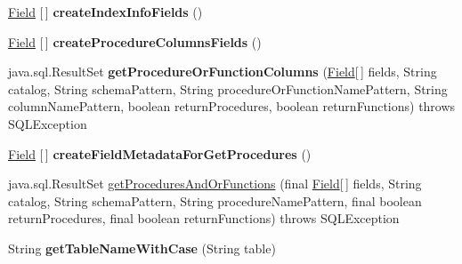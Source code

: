 \begin{DoxyCompactItemize}
\item 
\mbox{\label{classcom_1_1mysql_1_1cj_1_1jdbc_1_1_database_meta_data_a1bac977fae79104ef21d90a3d1d9613a}} 
\mbox{\hyperlink{classcom_1_1mysql_1_1cj_1_1result_1_1_field}{Field}} \mbox{[}$\,$\mbox{]} {\bfseries create\+Index\+Info\+Fields} ()
\item 
\mbox{\label{classcom_1_1mysql_1_1cj_1_1jdbc_1_1_database_meta_data_a3d9ed6638e8ae9061fcb2d3aaae74613}} 
\mbox{\hyperlink{classcom_1_1mysql_1_1cj_1_1result_1_1_field}{Field}} \mbox{[}$\,$\mbox{]} {\bfseries create\+Procedure\+Columns\+Fields} ()
\item 
\mbox{\label{classcom_1_1mysql_1_1cj_1_1jdbc_1_1_database_meta_data_ac29d34a30c88e14cc504dbfffc86d2bd}} 
java.\+sql.\+Result\+Set {\bfseries get\+Procedure\+Or\+Function\+Columns} (\mbox{\hyperlink{classcom_1_1mysql_1_1cj_1_1result_1_1_field}{Field}}\mbox{[}$\,$\mbox{]} fields, String catalog, String schema\+Pattern, String procedure\+Or\+Function\+Name\+Pattern, String column\+Name\+Pattern, boolean return\+Procedures, boolean return\+Functions)  throws S\+Q\+L\+Exception 
\item 
\mbox{\label{classcom_1_1mysql_1_1cj_1_1jdbc_1_1_database_meta_data_a69998cb9f2ac65c2120b05a846081a05}} 
\mbox{\hyperlink{classcom_1_1mysql_1_1cj_1_1result_1_1_field}{Field}} \mbox{[}$\,$\mbox{]} {\bfseries create\+Field\+Metadata\+For\+Get\+Procedures} ()
\item 
java.\+sql.\+Result\+Set \mbox{\hyperlink{classcom_1_1mysql_1_1cj_1_1jdbc_1_1_database_meta_data_a9dfc457702844c3d5e8a014b125f9199}{get\+Procedures\+And\+Or\+Functions}} (final \mbox{\hyperlink{classcom_1_1mysql_1_1cj_1_1result_1_1_field}{Field}}\mbox{[}$\,$\mbox{]} fields, String catalog, String schema\+Pattern, String procedure\+Name\+Pattern, final boolean return\+Procedures, final boolean return\+Functions)  throws S\+Q\+L\+Exception 
\item 
\mbox{\label{classcom_1_1mysql_1_1cj_1_1jdbc_1_1_database_meta_data_adc22cdd9a86edccdfef36c2048b66bfb}} 
String {\bfseries get\+Table\+Name\+With\+Case} (String table)

\end{DoxyCompactItemize}

